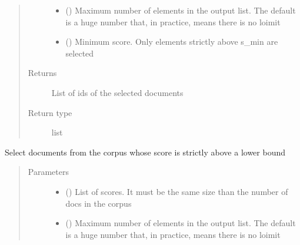 \documentclass[letterpaper,10pt,english]{sphinxmanual}
\begin{document}
\begin{fulllineitems}
\begin{fulllineitems}
\begin{quote}
\begin{description}
\begin{itemize}
\item {} 
\sphinxAtStartPar
{} () \textendash{} Maximum number of elements in the output list. The default is
a huge number that, in practice, means there is no loimit

\item {} 
\sphinxAtStartPar
{} () \textendash{} Minimum score. Only elements strictly above s\_min are selected

\end{itemize}

\item[{Returns}] \leavevmode
\sphinxAtStartPar
{} \textendash{} List of ids of the selected documents

\item[{Return type}] \leavevmode
\sphinxAtStartPar
list

\end{description}\end{quote}

\end{fulllineitems}


\begin{fulllineitems}
\label{\detokenize{dc_preprocessor:src.domain_classifier.preprocessor.CorpusDFProcessor.get_top_scores}}
\sphinxAtStartPar
Select documents from the corpus whose score is strictly above a lower
bound
\begin{quote}\begin{description}
\item[{Parameters}] \leavevmode\begin{itemize}
\item {} 
\sphinxAtStartPar
{} () \textendash{} List of scores. It must be the same size than the number of docs
in the corpus

\item {} 
\sphinxAtStartPar
{} () \textendash{} Maximum number of elements in the output list. The default is
a huge number that, in practice, means there is no loimit


\end{itemize}
\end{description}
\end{quote}
\end{fulllineitems}
\end{fulllineitems}
\end{document}

